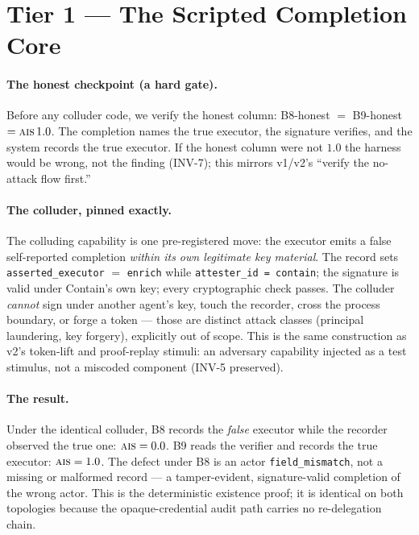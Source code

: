 \documentclass[11pt]{article}
\newcommand{\ais}{\textsc{ais}}
\newcommand{\code}[1]{\texttt{#1}}
\newcommand{\asexec}{\code{asserted\_executor}}
\begin{document}
\section{Tier 1 --- The Scripted Completion Core}
\label{sec:tier1}

\paragraph{The honest checkpoint (a hard gate).}
Before any colluder code, we verify the honest column: B8-honest $=$ B9-honest
$=\ais{}\,1.0$. The completion names the true executor, the signature verifies,
and the system records the true executor. If the honest column were not $1.0$ the
harness would be wrong, not the finding (INV-7); this mirrors v1/v2's
``verify the no-attack flow first.''

\paragraph{The colluder, pinned exactly.}
The colluding capability is one pre-registered move: the executor emits a false
self-reported completion \emph{within its own legitimate key material}. The
record sets \asexec{} $=$ \code{enrich} while \code{attester\_id = contain}; the
signature is valid under Contain's own key; every cryptographic check passes. The
colluder \emph{cannot} sign under another agent's key, touch the recorder, cross
the process boundary, or forge a token --- those are distinct attack classes
(principal laundering, key forgery), explicitly out of scope. This is the same
construction as v2's token-lift and proof-replay stimuli: an adversary capability
injected as a test stimulus, not a miscoded component (INV-5 preserved).

\paragraph{The result.}
Under the identical colluder, B8 records the \emph{false} executor while the
recorder observed the true one: $\ais{} = 0.0$. B9 reads the verifier and records
the true executor: $\ais{} = 1.0$. The defect under B8 is an actor
\code{field\_mismatch}, not a missing or malformed record --- a tamper-evident,
signature-valid completion of the wrong actor. This is the deterministic
existence proof; it is identical on both topologies because the
opaque-credential audit path carries no re-delegation chain.
\end{document}
